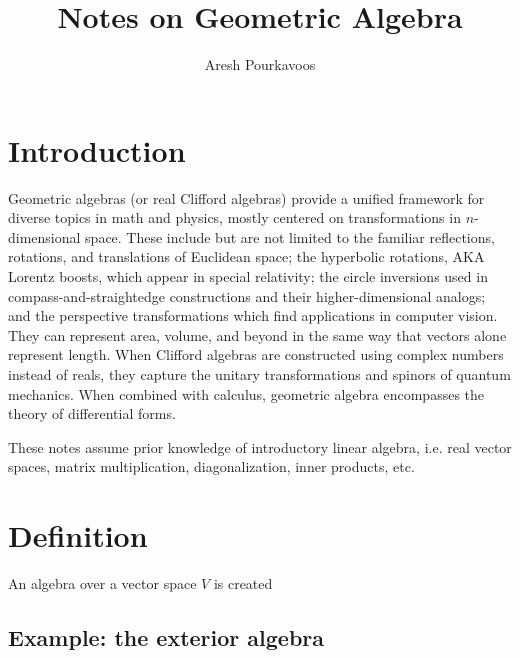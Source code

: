 \documentclass{article}
\begin{document}
\title{Notes on Geometric Algebra}
\author{Aresh Pourkavoos}
\date{}
\maketitle

\tableofcontents

\section{Introduction}
Geometric algebras (or real Clifford algebras) provide a unified framework
for diverse topics in math and physics,
mostly centered on transformations in $n$-dimensional space.
These include but are not limited to
the familiar reflections, rotations, and translations of Euclidean space;
the hyperbolic rotations, AKA Lorentz boosts, which appear in special relativity;
the circle inversions used in compass-and-straightedge constructions
and their higher-dimensional analogs;
and the perspective transformations which find applications in computer vision.
They can represent area, volume, and beyond
in the same way that vectors alone represent length.
When Clifford algebras are constructed using complex numbers instead of reals,
they capture the unitary transformations and spinors of quantum mechanics.
When combined with calculus, geometric algebra encompasses the theory of differential forms.

These notes assume prior knowledge of introductory linear algebra,
i.e. real vector spaces, matrix multiplication,
diagonalization, inner products, etc.

\section{Definition}

An algebra over a vector space $V$ is created

\subsection{Example: the exterior algebra}

\section{}
\end{document}
